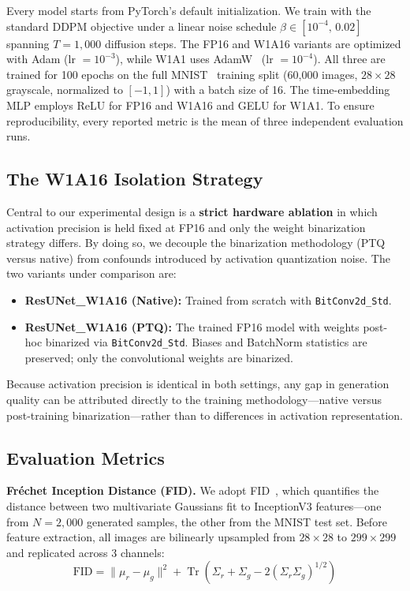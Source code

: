 \documentclass[twocolumn, journal]{IEEEtran}
\begin{document}
Every model starts from PyTorch's default initialization. We train with the standard
DDPM objective under a linear noise schedule $\beta \in [10^{-4},\,0.02]$ spanning
$T=1{,}000$ diffusion steps. The FP16 and W1A16 variants are optimized with
Adam (lr $=10^{-3}$), while W1A1 uses
AdamW~\cite{loshchilov2019adamw} (lr $=10^{-4}$). All three are trained for 100 epochs
on the full MNIST~\cite{lecun1998mnist} training split (60{,}000 images, $28{\times}28$ grayscale, normalized
to $[-1,1]$) with a batch size of 16. The time-embedding MLP employs ReLU for FP16 and
W1A16 and GELU for W1A1. To ensure reproducibility, every reported metric is the mean
of three independent evaluation runs.

\subsection{The W1A16 Isolation Strategy}

Central to our experimental design is a \textbf{strict hardware ablation} in which
activation precision is held fixed at FP16 and only the weight binarization strategy
differs. By doing so, we decouple the binarization methodology (PTQ versus native) from
confounds introduced by activation quantization noise. The two variants under comparison
are:

\begin{itemize}
  \item \textbf{ResUNet\_W1A16 (Native):} Trained from scratch with
    \texttt{BitConv2d\_Std}.
  \item \textbf{ResUNet\_W1A16 (PTQ):} The trained FP16 model with weights post-hoc
    binarized via \texttt{BitConv2d\_Std}. Biases and BatchNorm statistics are
    preserved; only the convolutional weights are binarized.
\end{itemize}

Because activation precision is identical in both settings, any gap in generation quality
can be attributed directly to the training methodology---native versus post-training
binarization---rather than to differences in activation representation.

\subsection{Evaluation Metrics}

\textbf{Fr\'echet Inception Distance (FID).} We adopt FID~\cite{heusel2017fid}, which
quantifies the distance between two multivariate Gaussians fit to InceptionV3 features---one
from $N=2{,}000$ generated samples, the other from the MNIST test set. Before feature
extraction, all images are bilinearly upsampled from $28{\times}28$ to $299{\times}299$
and replicated across 3 channels:
\begin{equation}
  \text{FID} = \|\mu_r - \mu_g\|^2 +
  \operatorname{Tr}\!\left(\Sigma_r + \Sigma_g -
  2(\Sigma_r\Sigma_g)^{1/2}\right)
  \label{eq:fid}
\end{equation}
\end{document}
